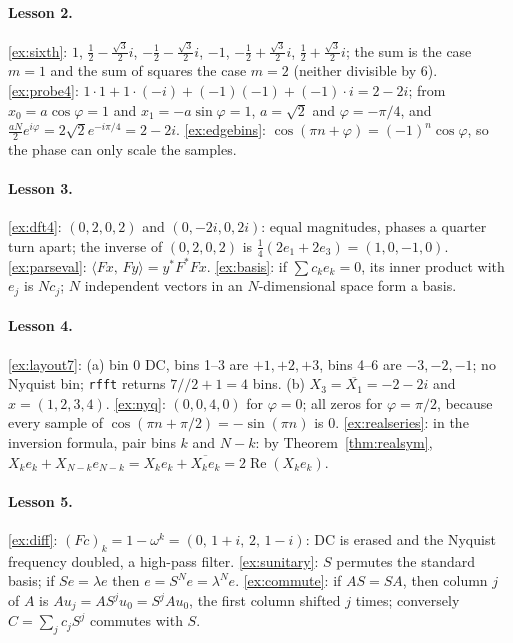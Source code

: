 \documentclass[11pt]{article}
\theoremstyle{definition}
\newcommand{\ip}[2]{\langle #1,\, #2\rangle}
\newcommand{\code}[1]{\texttt{#1}}
\begin{document}
\paragraph{Lesson 2.} \ref{ex:sixth}: $1$, $\frac12-\frac{\sqrt3}2i$,
$-\frac12-\frac{\sqrt3}2i$, $-1$, $-\frac12+\frac{\sqrt3}2i$, $\frac12+\frac{\sqrt3}2i$;
the sum is the case $m=1$ and the sum of squares the case $m=2$ (neither divisible by
6). \ref{ex:probe4}: $1\cdot1+1\cdot(-i)+(-1)(-1)+(-1)\cdot i=2-2i$; from
$x_0=a\cos\varphi=1$ and $x_1=-a\sin\varphi=1$, $a=\sqrt2$ and $\varphi=-\pi/4$, and
$\frac{aN}2e^{i\varphi}=2\sqrt2e^{-i\pi/4}=2-2i$. \ref{ex:edgebins}:
$\cos(\pi n+\varphi)=(-1)^n\cos\varphi$, so the phase can only scale the samples.

\paragraph{Lesson 3.} \ref{ex:dft4}: $(0,2,0,2)$ and $(0,-2i,0,2i)$: equal magnitudes,
phases a quarter turn apart; the inverse of $(0,2,0,2)$ is
$\frac14(2e_1+2e_3)=(1,0,-1,0)$. \ref{ex:parseval}: $\ip{Fx}{Fy}=y^*F^*Fx$.
\ref{ex:basis}: if $\sum c_ke_k=0$, its inner product with $e_j$ is $Nc_j$; $N$
independent vectors in an $N$-dimensional space form a basis.

\paragraph{Lesson 4.} \ref{ex:layout7}: (a) bin 0 DC, bins 1--3 are $+1,+2,+3$, bins
4--6 are $-3,-2,-1$; no Nyquist bin; \code{rfft} returns $7/\!/2+1=4$ bins. (b)
$X_3=\overline{X_1}=-2-2i$ and $x=(1,2,3,4)$. \ref{ex:nyq}: $(0,0,4,0)$ for
$\varphi=0$; all zeros for $\varphi=\pi/2$, because every sample of
$\cos(\pi n+\pi/2)=-\sin(\pi n)$ is 0. \ref{ex:realseries}: in the inversion formula,
pair bins $k$ and $N-k$: by Theorem~\ref{thm:realsym},
$X_ke_k+X_{N-k}e_{N-k}=X_ke_k+\overline{X_ke_k}=2\operatorname{Re}(X_ke_k)$.

\paragraph{Lesson 5.} \ref{ex:diff}: $(Fc)_k=1-\omega^k=(0,\,1+i,\,2,\,1-i)$: DC is
erased and the Nyquist frequency doubled, a high-pass filter. \ref{ex:sunitary}: $S$
permutes the standard basis; if $Se=\lambda e$ then $e=S^Ne=\lambda^Ne$.
\ref{ex:commute}: if $AS=SA$, then column $j$ of $A$ is $Au_j=AS^ju_0=S^jAu_0$, the
first column shifted $j$ times; conversely $C=\sum_jc_jS^j$ commutes with $S$.
\end{document}
